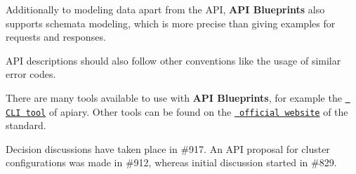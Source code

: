Additionally to modeling data apart from the A\+PI, {\bfseries{A\+PI Blueprints}} also supports schemata modeling, which is more precise than giving examples for requests and responses.


\begin{DoxyItemize}
\item A\+PI descriptions should also follow other conventions like the usage of similar error codes.
\end{DoxyItemize}

There are many tools available to use with {\bfseries{A\+PI Blueprints}}, for example the \href{https://github.com/apiaryio/apiary-client}{\texttt{ C\+LI tool}} of apiary. Other tools can be found on the \href{https://apiblueprint.org/tools.html}{\texttt{ official website}} of the standard.

Decision discussions have taken place in \#917. An A\+PI proposal for cluster configurations was made in \#912, whereas initial discussion started in \#829. 